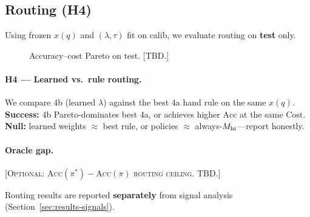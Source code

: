 \subsection{Routing (H4)}
\label{sec:results-routing}

Using frozen $x(q)$ and $(\lambda,\tau)$ fit on calib, we evaluate routing on \textbf{test} only.



\begin{figure}[t]
  \centering
  \caption{Accuracy--cost Pareto on test. \textsc{[TBD.]}}
  \label{fig:pareto}
\end{figure}

\paragraph{H4 --- Learned vs.\ rule routing.}
We compare 4b (learned $\lambda$) against the best 4a hand rule on the same $x(q)$.
\textbf{Success:} 4b Pareto-dominates best 4a, or achieves higher $\mathrm{Acc}$ at the same $\mathrm{Cost}$.
\textbf{Null:} learned weights $\approx$ best rule, or policies $\approx$ always-$M_{\mathrm{hi}}$---report honestly.

\paragraph{Oracle gap.}
\textsc{[Optional: $\mathrm{Acc}(\pi^*)-\mathrm{Acc}(\pi)$ routing ceiling. TBD.]}

Routing results are reported \textbf{separately} from signal analysis (Section~\ref{sec:results-signals}).
